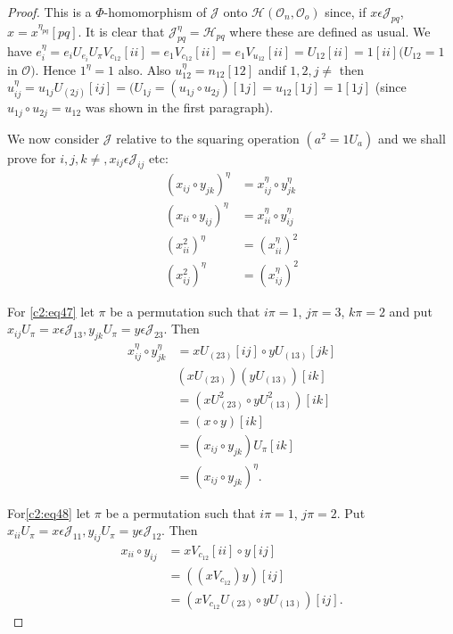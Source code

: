 \begin{proof}
This is a $\Phi$-homomorphism of $\mathscr{J}$ onto
$\mathscr{H}(\mathscr{O}_n,\mathscr{O}_o)$ since, if $x\epsilon
\mathscr{J}_{pq}$, $x=x^{\eta_{pq}}[pq]$. It is clear that
$\mathscr{J}^{\eta}_{pq}=\mathscr{H}_{pq}$ where these are defined as
usual. We have
$e^{\eta}_i=e_iU_{e_{i}}U_{\pi}V_{c_{12}}[ii]=e_1V_{c_{12}}[ii]=e_1V_{u_{12}}[ii]=
U_{12}[ii]=1[ii](U_{12}=1$ in $\mathscr{O})$. Hence $1^{\eta}=1$
also. Also $u^{\eta}_{12}=n_{12}[12]$ and\pageoriginale if $1,2,j\neq$
then $u^{\eta}_{ij}=u_{1j}U_{(2j)}[ij]=(U_{1j}=(u_{1j}\circ
u_{2j})[1j]=u_{12}[1j]=1[1j]$ (since $u_{1j}\circ u_{2j}=u_{12}$ was
  shown in the first paragraph).

We now consider $\mathscr{J}$ relative to the squaring operation
$(a^{2}=1U_a)$ and we shall prove for $i,j,k\neq, x_{ij}\epsilon
\mathscr{J}_{ij}$ etc:
\begin{align*}
  (x_{ij}\circ y_{jk})^{\eta}& =x^{\eta}_{ij}\circ
  y^{\eta}_{jk}\tag{47}\label{c2:eq47}\\
  (x_{ii}\circ y_{ij})^{\eta}& =x_{ii}^{\eta}\circ
  y^{\eta}_{ij}\tag{48}\label{c2:eq48}\\
  (x^{2}_{ii})^{\eta}& =(x^{\eta}_{ii})^{2}\tag{49}\label{c2:eq49}\\
  (x^{2}_{ij})^{\eta}& =(x^{\eta}_{ij})^{2}\tag{50}\label{c2:eq50}
\end{align*}

For \eqref{c2:eq47} let $\pi$ be a permutation such that $i\pi=1$, $j\pi=3$,
$k {\pi}=2$ and put $x_{ij}U_{\pi}=x\epsilon
\mathscr{J}_{13},y_{jk}U_{\pi}=y\epsilon \mathscr{J}_{23}$. Then
\begin{align*}
  x^{\eta}_{ij}\circ y^{\eta}_{jk}&=xU_{(23)}[ij]\circ y U_{(13)}[jk]\\
  &(xU_{(23)})(yU_{(13)})[ik]\\
  &=(xU^{2}_{(23)}\circ y U^{2}_{(13)})[ik]\\
  &=(x\circ y)[ik]\\
  &=(x_{ij}\circ y_{jk})U_{\pi}[ik]\\
  &=(x_{ij}\circ y_{jk})^{\eta}.
\end{align*}

For\pageoriginale \eqref{c2:eq48} let $\pi$ be a permutation such that
$i\pi=1$, $j\pi=2$. Put $x_{ii}U_{\pi}=x\epsilon
\mathscr{J}_{11},y_{ij} U_{\pi}= y\epsilon \mathscr{J}_{12}$. Then
\begin{align*}
  x_{ii}\circ y_{ij}&=xV_{c_{12}}[ii]\circ y[ij]\\
  &=((x V_{c_{12}})y)[ij]\\
  &=(xV_{c_{12}}U_{(23)}\circ yU_{(13)})[ij].
\end{align*}


\end{proof}
